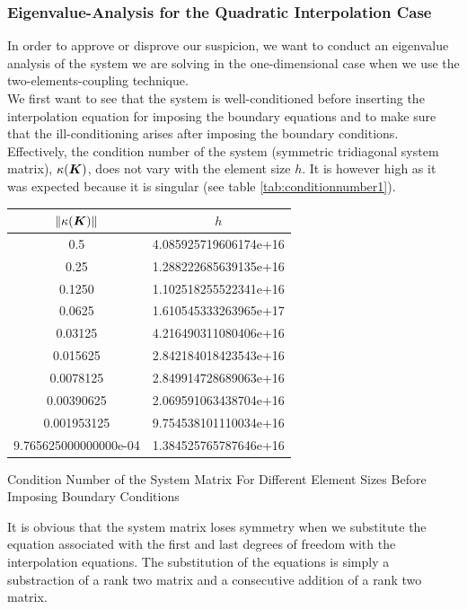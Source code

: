 \documentclass[a4paper,12pt]{article}
\makeatletter
\newcommand{\mb}[1]{{\mbox{\boldmath$#1$\unboldmath}}}
\newenvironment{tablehere}
  {\def\@captype{table}}
  {}
\makeatother
\begin{document}
\subsubsection{Eigenvalue-Analysis for the Quadratic Interpolation Case}
In order to approve or disprove our suspicion, we want to conduct an eigenvalue analysis of the system we are solving in the one-dimensional case when we use the two-elements-coupling technique.\\ We first want to see that the system is well-conditioned before inserting the interpolation equation for imposing the boundary equations and to make sure that the ill-conditioning arises after imposing the boundary conditions.\\Effectively, the condition number of the system (symmetric tridiagonal system matrix), $\kappa(\mb{K})$, does not vary with the element size $h$. It is however high as it was expected because it is singular (see table \ref{tab:conditionnumber1}).
\begin{center}
\begin{tablehere}
\begin{tabular}{cc}
 $\Vert \kappa(\mb{K}) \Vert$ & $h$ \\
\hline
\hline
0.5 & 4.085925719606174e+16\\
0.25 & 1.288222685639135e+16\\
0.1250 & 1.102518255522341e+16\\
0.0625 & 1.610545333263965e+17\\
0.03125 & 4.216490311080406e+16\\
0.015625 & 2.842184018423543e+16\\
0.0078125 & 2.849914728689063e+16\\
0.00390625 & 2.069591063438704e+16\\
0.001953125 & 9.754538101110034e+16\\
9.765625000000000e-04 & 1.384525765787646e+16\\
\end{tabular}
\caption{Condition Number of the System Matrix For Different Element Sizes Before Imposing Boundary Conditions}\label{tab:conditionnumber1}
\end{tablehere}
\end{center}
It is obvious that the system matrix loses symmetry when we substitute the equation associated with the first and last degrees of freedom with the interpolation equations. The substitution of the equations is simply a substraction of a rank two matrix and a consecutive addition of a rank two matrix.\\
\end{document}
